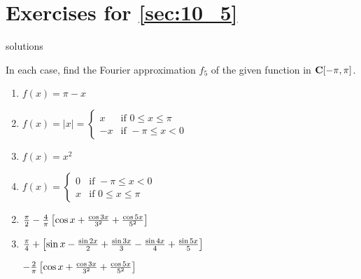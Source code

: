\section*{Exercises for \ref{sec:10_5}}

\begin{Filesave}{solutions}
\end{Filesave}

\begin{multicols}{2}
\begin{ex} \label{ex:10_5_1}
In each case, find the Fourier approximation $f_{5}$ of the given function in $\textbf{C}[-\pi, \pi]$.

\begin{enumerate}[label={\alph*.}]
\item $ f(x) = \pi - x $

\item $ f(x) = |x| = 
\left\{
\begin{array}{rl}
 x & \mbox{if } 0 \leq x \leq \pi \\
-x & \mbox{if } -\pi \leq x < 0
\end{array}
\right.$

\item $ f(x) = x^2 $

\item $f(x) =
\left\{
\begin{array}{rl}
0 & \mbox{if } -\pi \leq x < 0 \\
x & \mbox{if } 0 \leq x \leq \pi
\end{array}
\right.$

\end{enumerate}
\begin{sol}
\begin{enumerate}[label={\alph*.}]
\setcounter{enumi}{1}
\item $\displaystyle \tfrac{\pi}{2} - \tfrac{4}{\pi} \left[
\cos x + \tfrac{\cos 3x}{3^2} + \tfrac{\cos 5x}{5^2}
\right]$

\setcounter{enumi}{3}
\item $\displaystyle \tfrac{\pi}{4} + \left[
\sin x - \tfrac{\sin 2x}{2} + \tfrac{\sin 3x}{3} - \tfrac{\sin 4x}{4} +\tfrac{\sin 5x}{5}
\right]$ 

$\displaystyle -\tfrac{2}{\pi} \left[
\cos x + \tfrac{\cos 3x}{3^2} + \tfrac{\cos 5x}{5^2}
\right]$

\end{enumerate}
\end{sol}
\end{ex}


\end{multicols}
